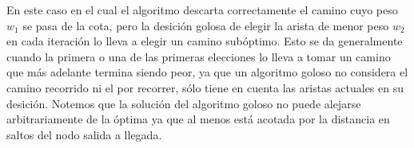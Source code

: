 En este caso en el cual el algoritmo descarta correctamente el camino cuyo peso $w_1$ se pasa de la cota, pero la desici\'on golosa de elegir la arista de menor peso $w_2$ en cada iteraci\'on lo lleva a elegir un camino sub\'optimo. Esto se da generalmente cuando la primera o una de las primeras elecciones lo lleva a tomar un camino que m\'as adelante termina siendo peor, ya que un algoritmo goloso no considera el camino recorrido ni el por recorrer, s\'olo tiene en cuenta las aristas actuales en su desici\'on. Notemos que la soluci\'on del algoritmo goloso no puede alejarse arbitrariamente de la \'optima ya que al menos est\'a acotada por la distancia en saltos del nodo salida a llegada.